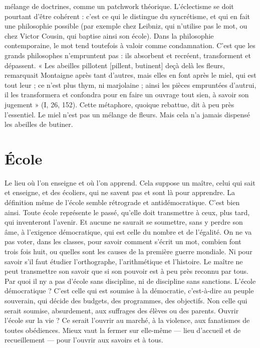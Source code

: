 mélange de doctrines, comme un patchwork théorique. L’éclectisme se doit
pourtant d’être cohérent : c’est ce qui le distingue du syncrétisme, et qui en fait
une philosophie possible (par exemple chez Leibniz, qui n’utilise pas le mot, ou
chez Victor Cousin, qui baptise ainsi son école). Dans la philosophie contemporaine,
le mot tend toutefois à valoir comme condamnation. C’est que les
grands philosophes n’empruntent pas : ils absorbent et recréent, transforment
et dépassent. « Les abeilles pillotent [pillent, butinent] deçà delà les fleurs,
remarquait Montaigne après tant d’autres, mais elles en font après le miel, qui
est tout leur ; ce n’est plus thym, ni marjolaine ; ainsi les pièces empruntées
d’autrui, il les transformera et confondra pour en faire un ouvrage tout sien, à
savoir son jugement » (I, 26, 152). Cette métaphore, quoique rebattue, dit à
peu près l'essentiel. Le miel n’est pas un mélange de fleurs. Mais cela n’a jamais
dispensé les abeilles de butiner.

\section{École}
Le lieu où l’on enseigne et où l’on apprend. Cela suppose un maître,
celui qui sait et enseigne, et des écoliers, qui ne savent pas et sont là
pour apprendre. La définition même de l’école semble rétrograde et antidémocratique.
C’est bien ainsi. Toute école représente le passé, qu’elle doit transmettre
à ceux, plus tard, qui inventeront l'avenir. Et aucune ne saurait se
soumettre, sans y perdre son âme, à l’exigence démocratique, qui est celle du
nombre et de l'égalité. On ne va pas voter, dans les classes, pour savoir comment
s'écrit un mot, combien font trois fois huit, ou quelles sont les causes de
la première guerre mondiale. Ni pour savoir s’il faut étudier l'orthographe,
l’arithmétique et l’histoire. Le maître ne peut transmettre son savoir que si son
pouvoir est à peu près reconnu par tous. Par quoi il ny a pas d’école sans discipline,
ni de discipline sans sanctions. L'école démocratique ? C’est celle qui
est soumise à la démocratie, c’est-à-dire au peuple souverain, qui décide des
budgets, des programmes, des objectifs. Non celle qui serait soumise, absurdement,
aux suffrages des élèves ou des parents. Ouvrir l’école sur la vie ? Ce
serait l'ouvrir au marché, à la violence, aux fanatismes de toutes obédiences.
Mieux vaut la fermer sur elle-même — lieu d’accueil et de recueillement — pour
l'ouvrir aux savoirs et à tous.

